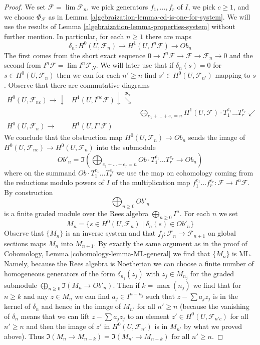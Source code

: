 \begin{proof}
\medskip\noindent
We set $\mathcal{F} = \lim \mathcal{F}_n$, we pick generators
$f_1, \ldots, f_r$ of $I$, we pick $c \geq 1$, and we choose
$\Phi_\mathcal{F}$ as in Lemma \ref{algebraization-lemma-cd-is-one-for-system}.
We will use the results of Lemma \ref{algebraization-lemma-properties-system}
without further mention. In particular, for each $n \geq 1$ there are maps
$$
\delta_n :
H^0(U, \mathcal{F}_n)
\longrightarrow
H^1(U, I^n\mathcal{F})
\longrightarrow
Ob_n
$$
The first comes from the short exact sequence
$0 \to I^n\mathcal{F} \to \mathcal{F} \to \mathcal{F}_n \to 0$
and the second from $I^n\mathcal{F} = \lim I^n\mathcal{F}_N$.
We will later use that if $\delta_n(s) = 0$ for $s \in H^0(U, \mathcal{F}_n)$
then we can for each $n' \geq n$ find $s' \in H^0(U, \mathcal{F}_{n'})$
mapping to $s$.
Observe that there are commutative diagrams
$$
\begin{array}{ccc}H^0(U, \mathcal{F}_{nc}) \longrightarrow\downarrow & H^1(U, I^{nc}\mathcal{F}) \downarrow\overset{\Phi_\mathcal{F}}{\searrow} &  \\  &  & \bigoplus_{e_1 + \ldots + e_r = n}
H^1(U, \mathcal{F}) \cdot T_1^{e_1} \ldots T_r^{e_r} \swarrow \\ H^0(U, \mathcal{F}_n) \longrightarrow & H^1(U, I^n\mathcal{F}) & \end{array}
$$
We conclude that the obstruction map
$H^0(U, \mathcal{F}_n) \to Ob_n$
sends the image of
$H^0(U, \mathcal{F}_{nc}) \to H^0(U, \mathcal{F}_n)$
into the submodule
$$
Ob'_n =
\Im\left(
\bigoplus\nolimits_{e_1 + \ldots + e_r = n}
Ob \cdot T_1^{e_1} \ldots T_r^{e_r} \to Ob_n
\right)
$$
where on the summand $Ob \cdot T_1^{e_1} \ldots T_r^{e_r}$
we use the map on cohomology coming from the reductions modulo
powers of $I$ of the multiplication map
$f_1^{e_1} \ldots f_r^{e_r} : \mathcal{F} \to I^n\mathcal{F}$.
By construction
$$
\bigoplus\nolimits_{n \geq 0} Ob'_n
$$
is a finite graded module over the Rees algebra $\bigoplus_{n \geq 0} I^n$.
For each $n$ we set
$$
M_n = \{s \in H^0(U, \mathcal{F}_n) \mid \delta_n(s) \in Ob'_n\}
$$
Observe that $\{M_n\}$ is an inverse system and that
$f_j : \mathcal{F}_n \to \mathcal{F}_{n + 1}$ on global
sections maps $M_n$ into $M_{n + 1}$.
By exactly the same argument as in the proof of
Cohomology, Lemma \ref{cohomology-lemma-ML-general}
we find that $\{M_n\}$ is ML. Namely, because the Rees algebra
is Noetherian we can choose a finite number of homogeneous generators
of the form $\delta_{n_j}(z_j)$ with $z_j \in M_{n_j}$ for the graded submodule
$\bigoplus_{n \geq 0} \Im(M_n \to Ob'_n)$.
Then if $k = \max(n_j)$ we find that for $n \geq k$
and any $z \in M_n$ we can find $a_j \in I^{n - n_j}$ such that
$z - \sum a_j z_j$ is in the kernel of $\delta_n$
and hence in the image of $M_{n'}$ for all $n' \geq n$
(because the vanishing of $\delta_n$ means that we can
lift $z - \sum a_j z_j$ to an element $z' \in H^0(U, \mathcal{F}_{n'c})$
for all $n' \ge n$ and then the image of $z'$ in $H^0(U, \mathcal{F}_{n'})$
is in $M_{n'}$ by what we proved above).
Thus $\Im(M_n \to M_{n - k}) = \Im(M_{n'} \to M_{n - k})$
for all $n' \geq n$.


\end{proof}

